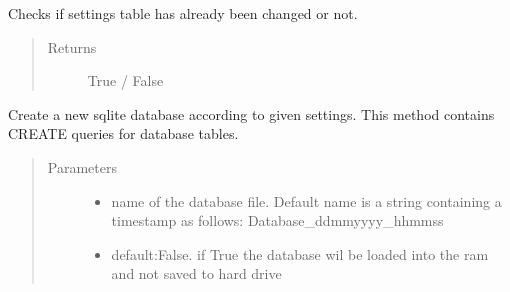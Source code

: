 \documentclass[letterpaper,10pt,english]{sphinxmanual}
\begin{document}
\begin{fulllineitems}
\begin{fulllineitems}
\begin{quote}
\begin{description}
\end{description}\end{quote}

\end{fulllineitems}


\begin{fulllineitems}
\label{\detokenize{api:beamon.database.Database.is_settings_preset}}
Checks if settings table has already been changed or not.
\begin{quote}\begin{description}
\item[{Returns}] \leavevmode
True / False

\end{description}\end{quote}

\end{fulllineitems}


\begin{fulllineitems}
\label{\detokenize{api:beamon.database.Database.make_dummy_file}}
Create a new sqlite database according to given settings. This method contains CREATE queries for database
tables.
\begin{quote}\begin{description}
\item[{Parameters}] \leavevmode\begin{itemize}
\item {} 
 \textendash{} name of the database file. Default name is a string containing a timestamp as follows:
Database\_dd\sphinxhyphen{}mm\sphinxhyphen{}yyyy\_hh\sphinxhyphen{}mm\sphinxhyphen{}ss

\item {} 
 \textendash{} default:False. if True the database wil be loaded into the ram and not saved to hard drive

\end{itemize}


\end{description}
\end{quote}
\end{fulllineitems}
\end{fulllineitems}
\end{document}
